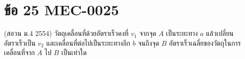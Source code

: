 \section*{ข้อ 25 \hfill \normalsize MEC-0025}
(สอวน ม.4 2554) วัตถุเคลื่อนที่ด้วยอัตราเร็วคงที่ $v_1$ จากจุด $A$ เป็นระยะทาง $a$ แล้วเปลี่ยนอัตราเร็วเป็น $v_2$ และเคลื่อนที่ต่อไปเป็นระยะทางอีก $b$ จนถึงจุด $B$ อัตราเร็วเฉลี่ยของวัตถุในการเคลื่อนที่จาก $A$ ไป $B$ เป็นเท่าใด
\medskip
